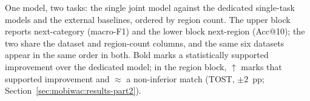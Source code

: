\begin{table}[htbp]
\caption{One model, two tasks: the single joint model against the dedicated single-task models and the
external baselines, ordered by region count. The upper block reports next-category (macro-F1) and the
lower block next-region (Acc@10); the two share the dataset and region-count columns, and the same
six datasets appear in the same order in both. Bold marks a statistically supported improvement over the dedicated model; in
the region block, $\uparrow$ marks that supported improvement and $\approx$ a non-inferior match
(TOST, $\pm2$~pp; Section~\ref{sec:mobiwac:results-part2}).}
\label{tab:mobiwac:results}
\centering
\begin{adjustbox}{max width=\textwidth}

\end{adjustbox}
\end{table}
